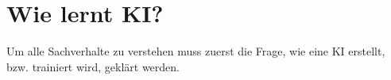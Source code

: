 \chapter{Wie lernt KI?}
\label{chap:ai-training}

Um alle Sachverhalte zu verstehen muss zuerst die Frage, wie eine KI erstellt, bzw. trainiert wird, geklärt werden.
